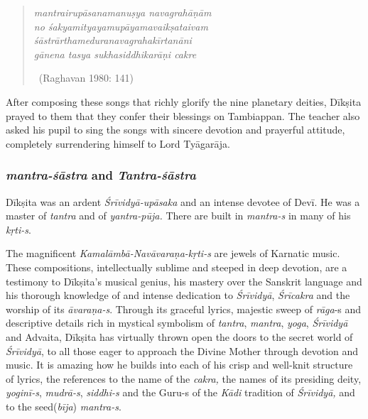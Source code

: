 \vspace{-.2cm}

\begin{verse}
\textit{mantrairupāsanamanuṣya navagrahāṇām}\\ \textit{no śakyamityayamupāyamavaikṣataivam} \\ \textit{śāstrārthameduranavagrahakīrtanāni}\\ \textit{gānena tasya sukhasiddhikarāṇi cakre}  

~\hfill (Raghavan 1980: 141)
\end{verse}

After composing these songs that richly glorify the nine planetary deities, Dīkṣita prayed to them that they confer their blessings on Tambiappan. The teacher also asked his pupil to sing the songs with sincere devotion and prayerful attitude, completely surrendering himself to Lord Tyāgarāja.

\newpage

\subsubsection*{\textit{mantra-śāstra} and \textit{Tantra-śāstra}}

Dīkṣita was an ardent \textit{Śrīvidyā-upāsaka} and an intense devotee of Devī. He was a master of \textit{tantra} and of \textit{yantra-pūja.} There are built in \textit{mantra-s} in many of his \textit{kṛti-s}.

The magnificent \textit{Kamalāmbā-Navāvaraṇa-kṛti-s} are jewels of Karnatic music. These compositions, intellectually sublime and steeped in deep devotion, are a testimony to Dīkṣita’s musical genius, his mastery over the Sanskrit language and his thorough knowledge of and intense dedication to \textit{Śrīvidyā}, \textit{Śrīcakra} and the worship of its \textit{āvaraṇa-s}. Through its graceful lyrics, majestic sweep of \textit{rāga}-s and descriptive details rich in mystical symbolism of \textit{tantra}, \textit{mantra}, \textit{yoga}, \textit{Śrīvidyā} and Advaita, Dīkṣita has virtually thrown open the doors to the secret world of \textit{Śrīvidyā}, to all those eager to approach the Divine Mother through devotion and music. It is amazing how he builds into each of his crisp and well-knit structure of lyrics, the references to the name of the \textit{cakra,} the names of its presiding deity, \textit{yoginī-s}, \textit{mudrā-s}, \textit{siddhi-s} and the Guru-s of the \textit{Kādi} tradition of \textit{Śrīvidyā,} and to the seed(\textit{bīja}) \textit{mantra-s}.


